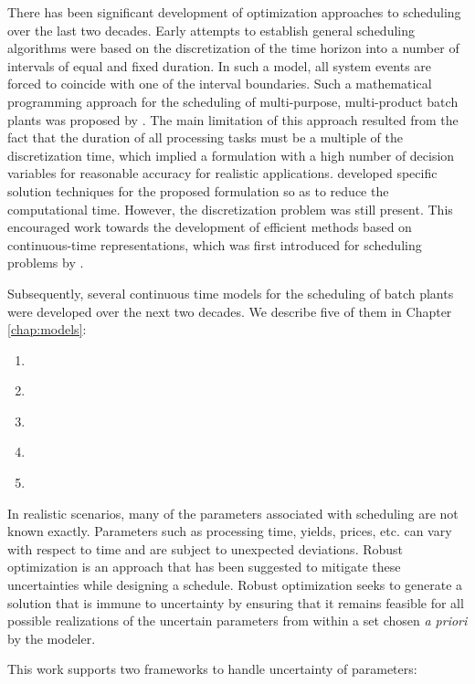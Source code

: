 There has been significant development of optimization approaches to scheduling over the last two decades. Early attempts to establish general scheduling algorithms were based on the discretization of the time horizon into a number of intervals of equal and fixed duration. In such a model, all system events are forced to coincide with one of the interval boundaries. 
Such a mathematical programming approach for the scheduling of multi-purpose, multi-product batch plants was proposed by \cite{KONDILI1993211}. The main limitation of this approach resulted from the fact that the duration of all processing tasks must be a multiple of the discretization time, which implied a formulation with a high number of decision variables for reasonable accuracy for realistic applications.
\cite{SHAH1993229} developed specific solution techniques for the proposed formulation so as to reduce the computational time. However, the discretization problem was still present. This encouraged work towards the development of efficient methods based on continuous-time representations, which was first introduced for scheduling problems by \cite{SAHINIDIS199185}.

Subsequently, several continuous time models for the scheduling of batch plants were developed over the next two decades. We describe five of them in Chapter \ref{chap:models}:
\begin{enumerate}
\item \cite{Castro}
\item \cite{Maravelias}
\item \cite{Gimenez}
\item \cite{Ierapetritou}
\item \cite{Karimi}
\end{enumerate}

\label{uncertaintysection}
In realistic scenarios, many of the parameters associated with scheduling are not known exactly. Parameters such as processing time, yields, prices, etc. can vary with respect to time and are subject to unexpected deviations. Robust optimization is an approach that has been suggested to mitigate these uncertainties while designing a schedule. Robust optimization seeks to generate a solution that is immune to uncertainty by ensuring that it remains feasible for all possible realizations of the uncertain parameters from within a set chosen \emph{a priori} by the modeler.

This work supports two frameworks to handle uncertainty of parameters:

